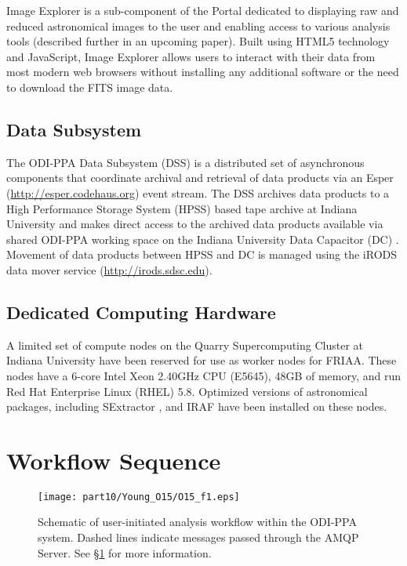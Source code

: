Image Explorer is a sub-component of the Portal dedicated to displaying raw and reduced astronomical images to the user and enabling access to various analysis tools (described further in an upcoming paper).   Built using HTML5 technology and JavaScript, Image Explorer allows users to interact with their data from most modern web browsers without installing any additional software or the need to download the FITS image data.

\subsection{Data Subsystem}
\label{section:dss}

The ODI-PPA Data Subsystem (DSS) is a distributed set of asynchronous components that coordinate archival and retrieval of data products via an Esper (\url{http://esper.codehaus.org}) event stream. The DSS archives data products to a High Performance Storage System (HPSS) based tape archive \citep{hpss} at Indiana University and makes direct access to the archived data products available via shared ODI-PPA working space on the Indiana University Data Capacitor (DC) \citep{dataCapacitor}.  Movement of data products between HPSS and DC is managed using the iRODS data mover service (\url{http://irods.sdsc.edu}).  

\subsection{Dedicated Computing Hardware}
\label{section:wn}

A limited set of compute nodes on the Quarry Supercomputing Cluster at Indiana University have been reserved for use as worker nodes for FRIAA.  These nodes have a 6-core Intel Xeon 2.40GHz CPU (E5645), 48GB of memory, and run Red Hat Enterprise Linux (RHEL) 5.8.  Optimized versions of astronomical packages, including SExtractor \citep{sextractor}, and IRAF \citep{iraf} have been installed on these nodes. 

\section{Workflow Sequence}
\label{section:workflow}

\begin{figure}
\texttt{[image: part10/Young\_O15/O15\_f1.eps]}
\caption{Schematic of user-initiated analysis workflow within the ODI-PPA system.  Dashed lines indicate messages passed through the AMQP Server. See \S\ref{section:workflow} for more information.}
\label{fig:workflow}
\end{figure}

